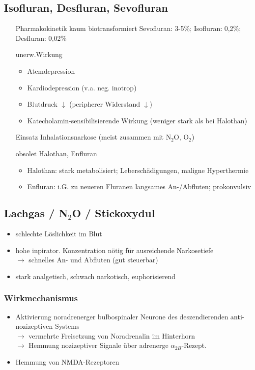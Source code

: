 \documentclass[10pt,a4paper]{report}
\begin{document}
\subsection{Isofluran, Desfluran, Sevofluran} %
\label{sub:isofluran_desfluran_sevofluran}
\begin{itemize}
	\item[Pharmakokinetik] kaum biotransformiert Sevofluran: 3-5\%; Isofluran: 0,2\%; Desfluran: 0,02\%
	\item[unerw.Wirkung]
		\begin{itemize}
			\item Atemdepression
			\item Kardiodepression (v.a. neg. inotrop)
			\item Blutdruck $\downarrow$ (peripherer Widerstand $\downarrow$)
			\item Katecholamin-sensibilisierende Wirkung (weniger stark als bei Halothan)
		\end{itemize}	
	\item[Einsatz] Inhalationsnarkose (meist zusammen mit N$_2$O, O$_2$)
	\item[obsolet] Halothan, Enfluran
	\begin{itemize}
		\item Halothan: stark metabolisiert; Leberschädigungen, maligne Hyperthermie
		\item Enfluran: i.G. zu neueren Fluranen langsames An-/Abfluten; prokonvulsiv
	\end{itemize}
\end{itemize}
\subsection{Lachgas / N$_2$O / Stickoxydul} %
\label{sub:lachgas_n__2_o_stickoxydul}
\begin{itemize}
	\item schlechte Löslichkeit im Blut
	\item hohe inpirator. Konzentration nötig für ausreichende Narkosetiefe\\
	$\rightarrow$ schnelles An- und Abfluten (gut steuerbar)
	\item stark analgetisch, schwach narkotisch, euphorisierend
\end{itemize}
\subsubsection{Wirkmechanismus} %
\label{ssub:wirkmechanismus}
\begin{itemize}
	\item Aktivierung noradrenerger bulbospinaler Neurone des deszendierenden anti-nozizeptiven Systems \\
	$\rightarrow$ vermehrte Freisetzung von Noradrenalin im Hinterhorn \\
	$\rightarrow$ Hemmung nozizeptiver Signale  über adrenerge $\alpha_{2B}$-Rezept.
	\item Hemmung von NMDA-Rezeptoren
\end{itemize}
\end{document}
